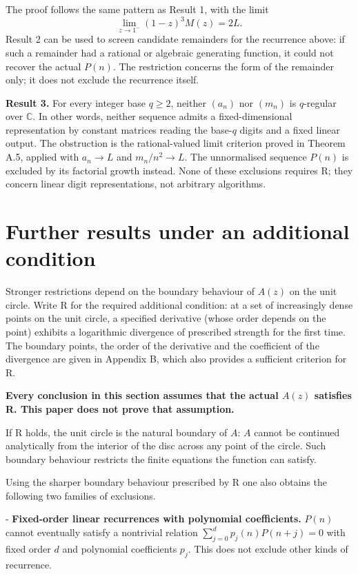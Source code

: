 \documentclass[11pt]{article}
\begin{document}
The proof follows the same pattern as Result 1, with the limit
\[
\lim_{z\to1^-}(1-z)^3M(z)=2L.
\]
Result 2 can be used to screen candidate remainders for the recurrence above: if such a remainder had a rational or algebraic generating function, it could not recover the actual $P(n)$. The restriction concerns the form of the remainder only; it does not exclude the recurrence itself.

\textbf{Result 3.} For every integer base $q\ge2$, neither $(a_n)$ nor $(m_n)$ is $q$-regular over $\mathbb C$. In other words, neither sequence admits a fixed-dimensional representation by constant matrices reading the base-$q$ digits and a fixed linear output. The obstruction is the rational-valued limit criterion proved in Theorem A.5, applied with $a_n\to L$ and $m_n/n^2\to L$. The unnormalised sequence $P(n)$ is excluded by its factorial growth instead. None of these exclusions requires R; they concern linear digit representations, not arbitrary algorithms.

\section{Further results under an additional condition}
Stronger restrictions depend on the boundary behaviour of $A(z)$ on the unit circle. Write R for the required additional condition: at a set of increasingly dense points on the unit circle, a specified derivative (whose order depends on the point) exhibits a logarithmic divergence of prescribed strength for the first time. The boundary points, the order of the derivative and the coefficient of the divergence are given in Appendix B, which also provides a sufficient criterion for R.

\textbf{Every conclusion in this section assumes that the actual $A(z)$ satisfies R. This paper does not prove that assumption.}

If R holds, the unit circle is the natural boundary of $A$: $A$ cannot be continued analytically from the interior of the disc across any point of the circle. Such boundary behaviour restricts the finite equations the function can satisfy.

Using the sharper boundary behaviour prescribed by R one also obtains the following two families of exclusions.

- \textbf{Fixed-order linear recurrences with polynomial coefficients.} $P(n)$ cannot eventually satisfy a nontrivial relation $\sum_{j=0}^{d}p_j(n)P(n+j)=0$ with fixed order $d$ and polynomial coefficients $p_j$. This does not exclude other kinds of recurrence.
\end{document}
